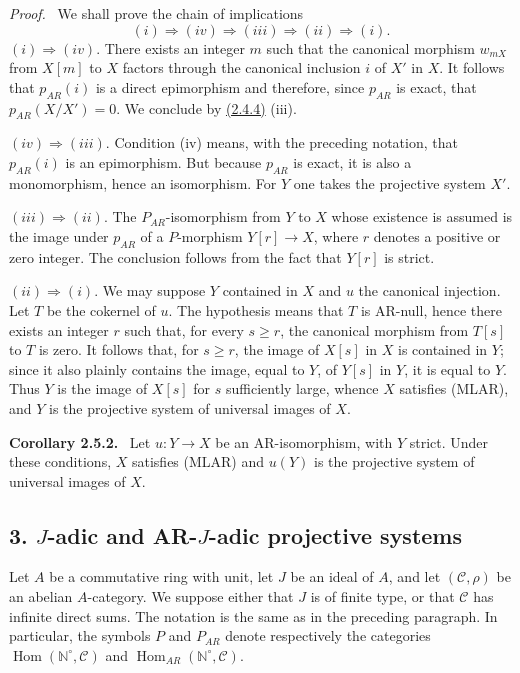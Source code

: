 \documentclass[11pt]{article}
\providecommand{\NN}{\mathbb{N}}
\newenvironment{statement}[1]{\par\medskip\noindent\textbf{#1.}\ }{\par\medskip}
\newenvironment{prooftext}[1][Proof]{\par\noindent\emph{#1.}\ }{\par\medskip}
\DeclareMathOperator{\Hom}{Hom}
\providecommand{\Hom}{\operatorname{Hom}}
\providecommand{\NN}{\mathbb N}
\providecommand{\cC}{\mathcal C}
\providecommand{\cC}{\mathcal C}
\providecommand{\Hom}{\operatorname{Hom}}
\begin{document}
\begin{prooftext}[Proof]
We shall prove the chain of implications
\[
(i)\Rightarrow(iv)\Rightarrow(iii)\Rightarrow(ii)\Rightarrow(i).
\]
$(i)\Rightarrow(iv)$. There exists an integer $m$ such that the canonical morphism $w_{mX}$ from $X[m]$ to $X$ factors through the canonical inclusion $i$ of $X'$ in $X$. It follows that $p_{AR}(i)$ is a direct epimorphism and therefore, since $p_{AR}$ is exact, that $p_{AR}(X/X')=0$. We conclude by \hyperref[sga5:V:proposition:2.4.4]{(2.4.4)} (iii).

$(iv)\Rightarrow(iii)$. Condition (iv) means, with the preceding notation, that $p_{AR}(i)$ is an epimorphism. But because $p_{AR}$ is exact, it is also a monomorphism, hence an isomorphism. For $Y$ one takes the projective system $X'$.

$(iii)\Rightarrow(ii)$. The $P_{AR}$-isomorphism from $Y$ to $X$ whose existence is assumed is the image under $p_{AR}$ of a $P$-morphism $Y[r]\to X$, where $r$ denotes a positive or zero integer. The conclusion follows from the fact that $Y[r]$ is strict.

$(ii)\Rightarrow(i)$. We may suppose $Y$ contained in $X$ and $u$ the canonical injection. Let $T$ be the cokernel of $u$. The hypothesis means that $T$ is AR-null, hence there exists an integer $r$ such that, for every $s\ge r$, the canonical morphism from $T[s]$ to $T$ is zero. It follows that, for $s\ge r$, the image of $X[s]$ in $X$ is contained in $Y$; since it also plainly contains the image, equal to $Y$, of $Y[s]$ in $Y$, it is equal to $Y$. Thus $Y$ is the image of $X[s]$ for $s$ sufficiently large, whence $X$ satisfies (MLAR), and $Y$ is the projective system of universal images of $X$.
\end{prooftext}

\label{sga5:V:corollary:2.5.2}\begin{statement}{Corollary 2.5.2}
Let $u:Y\to X$ be an AR-isomorphism, with $Y$ strict. Under these conditions, $X$ satisfies (MLAR) and $u(Y)$ is the projective system of universal images of $X$.
\end{statement}

\subsection*{3. $J$-adic and AR-$J$-adic projective systems}\label{sga5:V:subsection:3}
Let $A$ be a commutative ring with unit, let $J$ be an ideal of $A$, and let $(\cC,\rho)$ be an abelian $A$-category. We suppose either that $J$ is of finite type, or that $\cC$ has infinite direct sums. The notation is the same as in the preceding paragraph. In particular, the symbols $P$ and $P_{AR}$ denote respectively the categories $\Hom(\NN^\circ,\cC)$ and $\Hom_{AR}(\NN^\circ,\cC)$.
\end{document}

